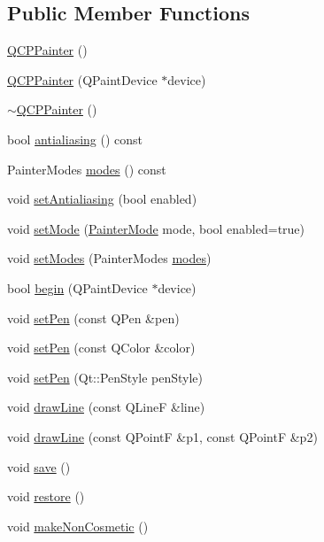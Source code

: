 \subsection*{Public Member Functions}
\begin{DoxyCompactItemize}
\item 
\hyperlink{classQCPPainter_a3c52cb0f43f34573d29bea487da28fe8}{Q\+C\+P\+Painter} ()
\item 
\hyperlink{classQCPPainter_ae58dbb1795ddc4351ab324dc9898aa22}{Q\+C\+P\+Painter} (Q\+Paint\+Device $\ast$device)
\item 
\hyperlink{classQCPPainter_aa8491da26c0bf7704a93e2dcbb0c5ba1}{$\sim$\+Q\+C\+P\+Painter} ()
\item 
bool \hyperlink{classQCPPainter_a13370d7996315a7150be2fc868da3d4a}{antialiasing} () const 
\item 
Painter\+Modes \hyperlink{classQCPPainter_a99b89eaf5363faaa1e1e6162856f436c}{modes} () const 
\item 
void \hyperlink{classQCPPainter_aaba1deb9188244d9ea65b035112b4d05}{set\+Antialiasing} (bool enabled)
\item 
void \hyperlink{classQCPPainter_af6b1f7d2bbc548b10aa55d8b6ad49577}{set\+Mode} (\hyperlink{classQCPPainter_a156cf16444ff5e0d81a73c615fdb156d}{Painter\+Mode} mode, bool enabled=true)
\item 
void \hyperlink{classQCPPainter_a5fac93adc29c7c4dea9f3e171e9e635e}{set\+Modes} (Painter\+Modes \hyperlink{classQCPPainter_a99b89eaf5363faaa1e1e6162856f436c}{modes})
\item 
bool \hyperlink{classQCPPainter_a0a41146ccd619dceab6e25ec7b46b044}{begin} (Q\+Paint\+Device $\ast$device)
\item 
void \hyperlink{classQCPPainter_af9c7a4cd1791403901f8c5b82a150195}{set\+Pen} (const Q\+Pen \&pen)
\item 
void \hyperlink{classQCPPainter_a5c4d88f21564e156e88ef807f7cf0003}{set\+Pen} (const Q\+Color \&color)
\item 
void \hyperlink{classQCPPainter_a25e76095aae41da0d08035060e5f81ca}{set\+Pen} (Qt\+::\+Pen\+Style pen\+Style)
\item 
void \hyperlink{classQCPPainter_a0b4b1b9bd495e182c731774dc800e6e0}{draw\+Line} (const Q\+LineF \&line)
\item 
void \hyperlink{classQCPPainter_ad1638db27929491b3f1beb74d6cbad5e}{draw\+Line} (const Q\+PointF \&p1, const Q\+PointF \&p2)
\item 
void \hyperlink{classQCPPainter_a8fd6821ee6fecbfa04444c9062912abd}{save} ()
\item 
void \hyperlink{classQCPPainter_a64908e6298d5bbd83457dc987cc3a022}{restore} ()
\item 
void \hyperlink{classQCPPainter_a7e63fbcf47e35c6f2ecd11b8fef7c7d8}{make\+Non\+Cosmetic} ()
\end{DoxyCompactItemize}
